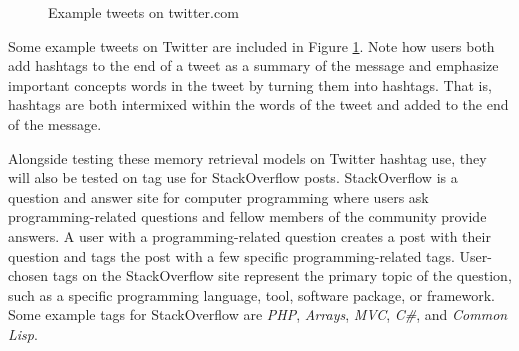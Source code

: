 \documentclass[man,floatsintext,donotrepeattitle]{apa6}
\begin{document}
\begin{figure}[!htbp]
  {%
    \setlength{\fboxsep}{0pt}%
    \setlength{\fboxrule}{1pt}%
    \hfill
    \hfill
    \hfill
    \vfill
    \hfill
    \hfill
    \hfill
    \caption{Example tweets on twitter.com}
    \label{figTweetExample}
  }%
\end{figure}

Some example tweets on Twitter are included in Figure \ref{figTweetExample}.
Note how users both add hashtags to the end of a tweet as a summary of the message and emphasize important concepts words in the tweet by turning them into hashtags.
That is, hashtags are both intermixed within the words of the tweet and added to the end of the message.

Alongside testing these memory retrieval models on Twitter hashtag use, they will also be tested on tag use for StackOverflow posts.
StackOverflow is a question and answer site for computer programming where users ask programming-related questions and fellow members of the community provide answers.
A user with a programming-related question creates a post with their question and tags the post with a few specific programming-related tags. 
User-chosen tags on the StackOverflow site represent the primary topic of the question, such as a specific programming language, tool, software package, or framework.
Some example tags for StackOverflow are \emph{PHP}, \emph{Arrays}, \emph{MVC}, \emph{C\#}, and \emph{Common Lisp}.
 
\end{document}
